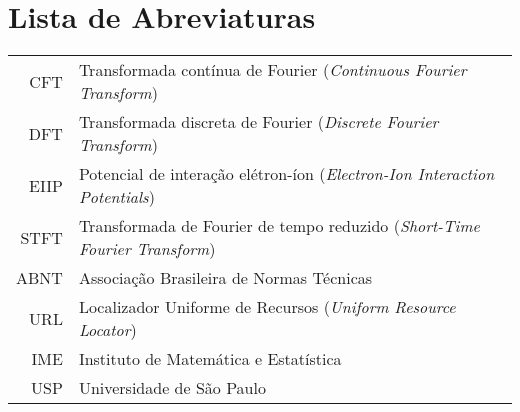     \newcommand\disablenewpage[1]{{\let\clearpage\par\let\cleardoublepage\par #1}}
    
    \bgroup
    \raggedbottom
    
    
    \disablenewpage{\chapter*{Lista de Abreviaturas}}
    
    \begin{tabular}{rl}
       CFT & Transformada contínua de Fourier (\emph{Continuous Fourier Transform})\\
       DFT & Transformada discreta de Fourier (\emph{Discrete Fourier Transform})\\
      EIIP & Potencial de interação elétron-íon (\emph{Electron-Ion Interaction Potentials})\\
      STFT & Transformada de Fourier de tempo reduzido (\emph{Short-Time Fourier Transform})\\
      ABNT & Associação Brasileira de Normas Técnicas\\
       URL & Localizador Uniforme de Recursos (\emph{Uniform Resource Locator})\\
       IME & Instituto de Matemática e Estatística\\
       USP & Universidade de São Paulo
    \end{tabular}
    
